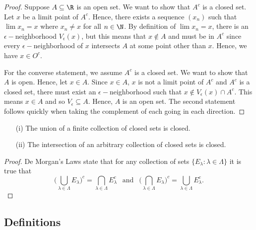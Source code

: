 \begin{proof}
    Suppose \( A \subseteq \R  \) is an open set. We want to show that \( A^c \) is a closed set. Let \( x  \) be a limit point of \( A^c \). Hence, there exists a sequence \( (x_n) \) such that \( \lim x_n = x \) where \( x_n \neq x  \) for all \( n \in \N  \). By definition of \( \lim x_n = x  \), there is an \( \epsilon- \)neighborhood \( V_{\epsilon } (x) \), but this means that \( x \notin A \) and must be in \( A^c \) since every \( \epsilon - \)neighborhood of \( x \) intersects \( A \) at some point other than \( x \). Hence, we have \( x \in O^c \). 
    
    For the converse statement, we assume \( A^c \) is a closed set. We want to show that \( A \) is open. Hence, let \( x \in A \). Since \( x \in A \), \( x \) is not a limit point of \( A^c \) and \( A^c \) is a closed set, there must exist an \( \epsilon - \)neighborhood such that \( x \notin V_{\epsilon }(x) \cap A^c \). This means \( x \in A \) and so \( V_{\epsilon } \subseteq A \). Hence, \( A \) is an open set.  
    The second statement follows quickly when taking the complement of each going in each direction.
\end{proof}

\begin{tcolorbox}
\begin{thm}
\begin{enumerate}
    \item[(i)] The union of a finite collection of closed sets is closed. 
    \item[(ii)] The intersection of an arbitrary collection of closed sets is closed. 
\end{enumerate}
\end{thm}
\end{tcolorbox}

\begin{proof}
    De Morgan's Laws state that for any collection of sets \( \{ E_{\lambda} : \lambda \in \Lambda \}  \) it is true that 
    \[ \Big( \bigcup_{\lambda \in \Lambda} E_{\lambda}\Big)^c = \bigcap_{\lambda \in \Lambda} E_{\lambda}^c ~~ \text{ and } ~~ \Big( \bigcap_{\lambda \in \Lambda} E_{\lambda}\Big)^c = \bigcup_{\lambda \in \Lambda} E_{\lambda}^c. \]
\end{proof}


\subsection{Definitions}


